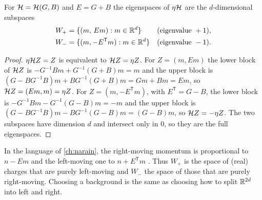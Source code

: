 \begin{lemma}\label{lem:odd:graph}
For $\mathcal{H}=\mathcal{H}(G,B)$ and $E=G+B$ the eigenspaces of $\eta\mathcal{H}$ are the $d$-dimensional
subspaces
\begin{equation}\label{eq:odd:graph}
\begin{aligned}
 W_+&=\{(m,\,Em):m\in\mathbb{R}^d\}&&(\text{eigenvalue }+1),\\
 W_-&=\{(m,-E^{\mathsf T}m):m\in\mathbb{R}^d\}&&(\text{eigenvalue }-1).
\end{aligned}
\end{equation}
\end{lemma}
\begin{proof}
$\eta\mathcal{H} Z=Z$ is equivalent to $\mathcal{H} Z=\eta Z$. For $Z=(m,Em)$ the lower block of $\mathcal{H} Z$ is
$-G^{-1}Bm+G^{-1}(G+B)m=m$ and the upper block is
$(G-BG^{-1}B)m+BG^{-1}(G+B)m=Gm+Bm=Em$, so $\mathcal{H} Z=(Em,m)=\eta Z$. For $Z=(m,-E^{\mathsf T}m)$,
with $E^{\mathsf T}=G-B$, the lower block is $-G^{-1}Bm-G^{-1}(G-B)m=-m$ and the upper
block is $(G-BG^{-1}B)m-BG^{-1}(G-B)m=(G-B)m$, so $\mathcal{H} Z=-\eta Z$. The two subspaces have
dimension $d$ and intersect only in $0$, so they are the full eigenspaces.
\end{proof}
In the language of \cref{ch:narain}, the right-moving momentum is proportional to $n-Em$
and the left-moving one to $n+E^{\mathsf T}m$ . Thus $W_+$ is the space of (real) charges that are purely left-moving and
$W_-$ the space of those that are purely right-moving. Choosing a background is the same as
choosing how to split $\mathbb{R}^{2d}$ into left and right.

